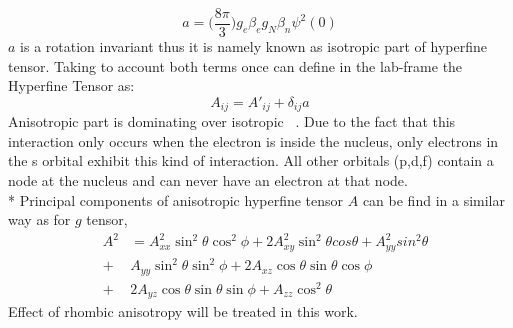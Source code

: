 \begin{equation}\label{eq:26}
a= \Big(\frac{8\pi}{3}\Big)g_e\beta_eg_N\beta_n\psi^2(0)
\end{equation}
$a$ is a rotation invariant thus it is namely known as isotropic part of hyperfine tensor. Taking to account both terms once can define in the lab-frame the Hyperfine Tensor as:  
\begin{equation}\label{eq:27}
A_{ij}=A'_{ij}+\delta_{ij}a
\end{equation} 
Anisotropic part is dominating over isotropic~\cite{griff} . Due to the fact that this interaction only occurs when the electron is inside the nucleus, only electrons in the s orbital exhibit this kind of interaction. All other orbitals (p,d,f) contain a node at the nucleus and can never have an electron at that node.\\* Principal components of anisotropic hyperfine  tensor $A$ can be find in a similar way as for $g$ tensor,
\begin{equation}\label{eq:atengeneral}
\begin{array} {lcl} &A^2& = A_{xx}^2\sin^2\theta\cos^2\phi+2A_{xy}^2\sin^2\theta cos\theta+A_{yy}^2sin^2\theta\\ & + & A_{yy}\sin^2\theta\sin^2\phi+2A_{xz}\cos\theta\sin\theta\cos\phi\\ & + & 2A_{yz}\cos\theta\sin\theta\sin\phi+A_{zz}\cos^2\theta \end{array}
\end{equation}
Effect of rhombic anisotropy will be treated in this work. 
